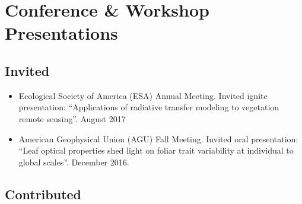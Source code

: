 \section*{Conference \& Workshop Presentations}

\subsection*{Invited}

\begin{itemize}
  \item Ecological Society of America (ESA) Annual Meeting.
  Invited ignite presentation: ``Applications of radiative transfer modeling to vegetation remote sensing''.
  August 2017

  \item American Geophysical Union (AGU) Fall Meeting.
  Invited oral presentation: ``Leaf optical properties shed light on foliar trait variability at individual to global scales''.
  December 2016.
\end{itemize}

\subsection{Contributed}

